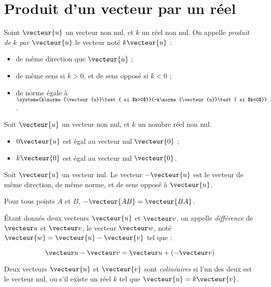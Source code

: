 \section{Produit d'un vecteur par un réel}

\begin{definition}
  Soint $\vecteur{u}$ un vecteur non nul, et $k$ un réel non nul. On appelle \emph{produit de $k$ par $\vecteur{u}$} le vecteur noté $k\vecteur{u}$ :
  \begin{itemize}
    \item de même direction que $\vecteur{u}$ ;
    \item de même sens si $k>0$, et de sens opposé si $k<0$ ;
    \item de norme égale à $\systeme{k\norme{\vecteur{u}}\text{ si $k>0$}}{-k\norme{\vecteur{u}}\text{ si $k<0$}}$.
  \end{itemize}
\end{definition}

\begin{definition}
  Soit $\vecteur{u}$ un vecteur non nul, et $k$ un nombre réel non nul.
  \begin{itemize}
    \item $0\vecteur{u}$ est égal au vecteur nul $\vecteur{0}$ ;
    \item $k\vecteur{0}$ est égal au vecteur nul $\vecteur{0}$.
  \end{itemize}
\end{definition}

\begin{propriete}
  Soit $\vecteur{u}$ un vecteur nul. Le vecteur $-\vecteur{u}$ est le vecteur de même direction, de même norme, et de sens opposé à $\vecteur{u}$.
\end{propriete}

\begin{propriete}
  Pour tous points $A$ et $B$, $-\vecteur{AB}=\vecteur{BA}$.
\end{propriete}

\begin{definition}
  Étant donnés deux vecteurs $\vecteur{u}$ et $\vecteur v$, on appelle
  \emph{différence} de $\vecteur u$ et $\vecteur v$, le vecteur $\vecteur w$, noté \emph{$\vecteur{w}=\vecteur{u}-\vecteur{v}$} tel que :

  \[\vecteur u-\vecteur v=\vecteur u + (-\vecteur v)\]
\end{definition}

\begin{definition}
  Deux vecteurs $\vecteur{u}$ et $\vecteur{v}$ sont \emph{colinéaires} si l'un des deux est le vecteur nul, ou s'il existe un réel $k$ tel que $\vecteur{u}=k\vecteur{v}$.
\end{definition}


